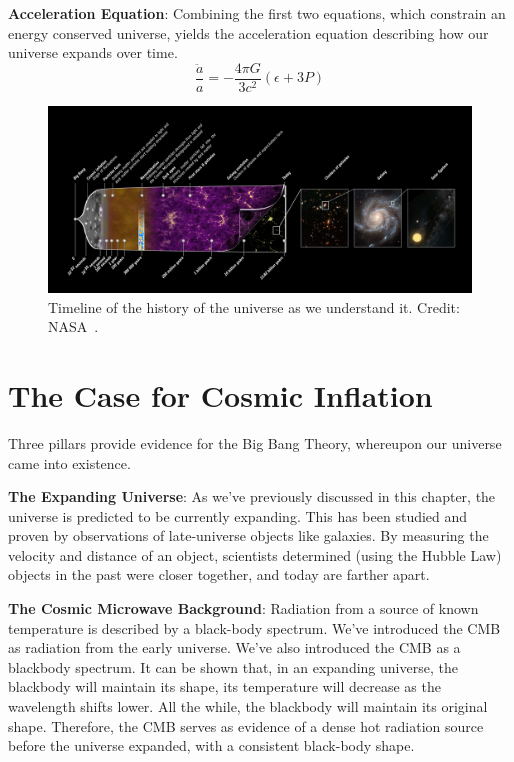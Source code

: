 \noindent
\textbf{Acceleration Equation}: Combining the first two equations, which constrain an energy conserved universe, yields the acceleration equation describing how our universe expands over time.  
\begin{equation}
    \frac{\ddot{a}}{a} = - \frac{4\pi G}{3 c^2} (\epsilon + 3 P)
\end{equation}

\begin{figure}
    \centering
    \includegraphics[width=\textwidth]{Figures/universe.jpg}
    \caption{Timeline of the history of the universe as we understand it. Credit: NASA~\cite{NASApic}.}
    \label{fig:universe_timeline}
\end{figure}
\section{The Case for Cosmic Inflation}
Three pillars provide evidence for the Big Bang Theory, whereupon our universe came into existence.

\noindent
\textbf{The Expanding Universe}: As we've previously discussed in this chapter, the universe is predicted to be currently expanding.  This has been studied and proven by observations of late-universe objects like galaxies.  By measuring the velocity and distance of an object, scientists determined (using the Hubble Law) objects in the past were closer together, and today are farther apart.  

\noindent
\textbf{The Cosmic Microwave Background}:
Radiation from a source of known temperature is described by a black-body spectrum.  We've introduced the CMB as radiation from the early universe.  We've also introduced the CMB as a blackbody spectrum.  It can be shown that, in an expanding universe, the blackbody will maintain its shape, its temperature will decrease as the wavelength shifts lower.  All the while, the blackbody will maintain its original shape.  Therefore, the CMB serves as evidence of a dense hot radiation source before the universe expanded, with a consistent black-body shape.

